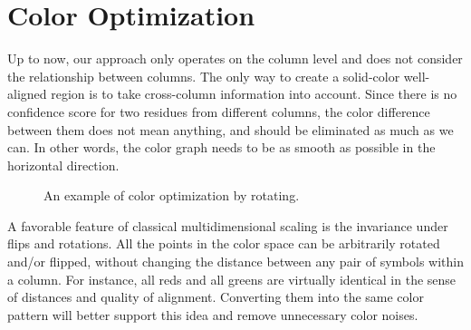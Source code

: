 \section{Color Optimization}

Up to now, our approach only operates on the column level and does not consider the relationship between columns. The only way to create a solid-color well-aligned region is to take cross-column information into account. Since there is no confidence score for two residues from different columns, the color difference between them does not mean anything, and should be eliminated as much as we can. In other words, the color graph needs to be as smooth as possible in the horizontal direction.

\begin{figure}[hbt]
\caption[Color Optimization by Rotation]{An example of color optimization by rotating.}\label{fig:chap2_rotate}
\end{figure}

A favorable feature of classical multidimensional scaling is the invariance under flips and rotations. All the points in the color space can be arbitrarily rotated and/or flipped, without changing the distance between any pair of symbols within a column. For instance, all reds and all greens are virtually identical in the sense of distances and quality of alignment. Converting them into the same color pattern will better support this idea and remove unnecessary color noises.

